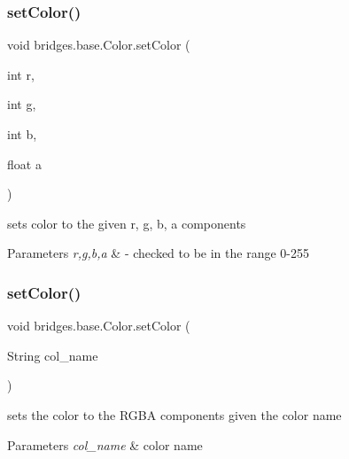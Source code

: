 \subsubsection{\texorpdfstring{setColor()}{setColor()}\hspace{0.1cm}{\footnotesize\ttfamily [1/2]}}
{\footnotesize\ttfamily void bridges.\+base.\+Color.\+set\+Color (\begin{DoxyParamCaption}\item[{int}]{r,  }\item[{int}]{g,  }\item[{int}]{b,  }\item[{float}]{a }\end{DoxyParamCaption})}

sets color to the given r, g, b, a components


\begin{DoxyParams}{Parameters}
{\em r,g,b,a} & -\/ checked to be in the range 0-\/255 \\
\hline
\end{DoxyParams}
\mbox{\label{classbridges_1_1base_1_1_color_a54dcd31227bde0f5d0a4f5d3b5a24ed2}} 
\subsubsection{\texorpdfstring{setColor()}{setColor()}\hspace{0.1cm}{\footnotesize\ttfamily [2/2]}}
{\footnotesize\ttfamily void bridges.\+base.\+Color.\+set\+Color (\begin{DoxyParamCaption}\item[{String}]{col\+\_\+name }\end{DoxyParamCaption})}

sets the color to the R\+G\+BA components given the color name


\begin{DoxyParams}{Parameters}
{\em col\+\_\+name} & color name \\
\hline
\end{DoxyParams}
\mbox{\label{classbridges_1_1base_1_1_color_a415a28133ade4e216c02ecdfc8a32a1d}} 
